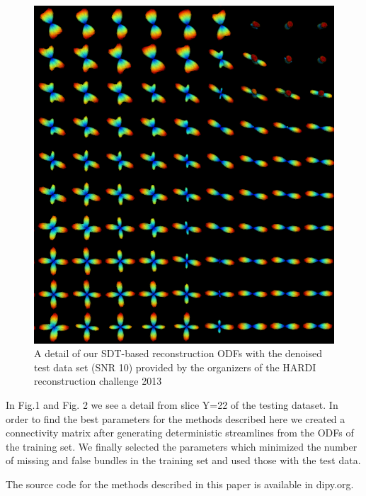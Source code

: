 \documentclass[9pt,conference,a4paper]{IEEEtran}
\begin{document}
\begin{figure}[h]
\begin{centering}
\includegraphics[scale=1.]{sdt_test_snr10}
\end{centering}
\caption{A detail of our SDT-based reconstruction ODFs with the denoised test data set (SNR 10) provided by the organizers of the HARDI reconstruction challenge 2013}
\end{figure}

In Fig.1 and Fig. 2 we see a detail from slice Y=22 of the testing dataset. In order to find the best parameters for the methods described here we created a connectivity matrix after generating deterministic streamlines from the ODFs of the training set. We finally selected the parameters which minimized the number of missing and false bundles in the training set and used those with the test data. 

The source code for the methods described in this paper is available in dipy.org.



\end{document}
